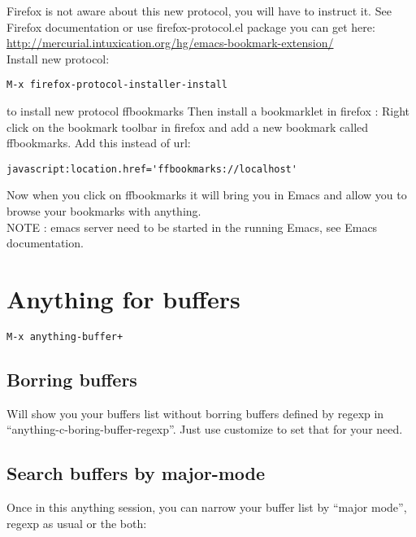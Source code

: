 \documentclass[a4paper,11pt]{article}
\begin{document}
Firefox is not aware about this new protocol, you will have to instruct
it. See Firefox documentation or use firefox-protocol.el package you can get
here: \\
\url{http://mercurial.intuxication.org/hg/emacs-bookmark-extension/} \\
Install new protocol: \\
\begin{verbatim}
M-x firefox-protocol-installer-install
\end{verbatim}
to install new protocol ffbookmarks
Then install a bookmarklet in firefox : Right click on the bookmark
toolbar in firefox and add a new bookmark called ffbookmarks. Add this
instead of url: \\
\begin{verbatim}
javascript:location.href='ffbookmarks://localhost'
\end{verbatim}

Now when you click on ffbookmarks it will bring you in Emacs and allow
you to browse your bookmarks with anything.
\\
NOTE : emacs server need to be started in the running Emacs, see Emacs
documentation.

\section{Anything for buffers}
\label{sec:anything-buffers}

\begin{verbatim}
M-x anything-buffer+
\end{verbatim}

\subsection{Borring buffers}
\label{sec:borring-buffers}

Will show you your buffers list without borring buffers defined by regexp in
``anything-c-boring-buffer-regexp''.
Just use customize to set that for your need.\\

\subsection{Search buffers by major-mode}
\label{sec:search-buffers-major}


Once in this anything session, you can narrow your buffer list by ``major mode'', regexp as usual or the both:\\
\end{document}
